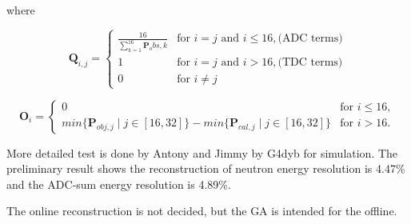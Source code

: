 where

\begin{equation}
\label{eq:fitnessQTimeOffset}
\mathbf{Q}_{i,j}
= \left\{
    \begin{array}{lll}
        \frac{16}{\sum^16_{k=1}\mathbf{P}_obs,k} & \mbox{for } i=j \mbox{ and } i\leq16, \mbox{(ADC terms)} \\
        1 & \mbox{for } i=j \mbox{ and } i>16, \mbox{(TDC terms)} \\
        0 & \mbox{for } i{\neq}j
    \end{array} \right.
\end{equation}

\begin{equation}
\label{eq:fitnessOTimeOffset}
\mathbf{O}_i =
\left\{
    \begin{array}{ll}
    0 & \mbox{for } i\leq16, \\
    min\{\mathbf{P}_{obj,j}{\mid}j\in[16,32]\} - min\{\mathbf{P}_{cal,j}{\mid}j\in[16,32]\}  & \mbox{for } i>16.
    \end{array} \right.
\end{equation}


More detailed test is done by Antony and Jimmy by G4dyb for simulation.
The preliminary result shows the reconstruction of neutron energy resolution is 4.47\%
and the ADC-sum energy resolution is 4.89\%.


The online reconstruction is not decided, but the GA is intended for
the offline.
